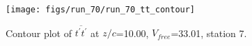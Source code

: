 \begin{figure}[H]
\centering
\texttt{[image: figs/run\_70/run\_70\_tt\_contour]}
\caption{Contour plot of $\overline{t^\prime t^\prime}$ at $z/c$=10.00, $V_{free}$=33.01, station 7.}
\end{figure}


